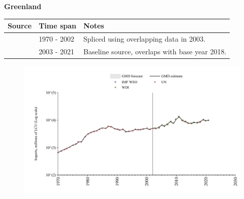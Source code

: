 \documentclass[12pt,a4paper,landscape]{article}
\begin{document}
\begin{adjustbox}{max totalsize={\paperwidth}{\paperheight},center}
\begin{minipage}[t][\textheight][t]{\textwidth}
\vspace*{0.5cm}
{}
\begin{center}
{\Large\bfseries Greenland}
\end{center}
\vspace{0.5cm}
\begin{table}[H]
\centering
\small
\begin{tabular}{|l|l|l|}
\hline
\textbf{Source} & \textbf{Time span} & \textbf{Notes} \\
\hline
\rowcolor{white}\cite{UN}& 1970 - 2002 &Spliced using overlapping data in 2003.\\
\rowcolor{lightgray}\cite{WDI}& 2003 - 2021 &Baseline source, overlaps with base year 2018.\\
\hline
\end{tabular}
\end{table}
\begin{figure}[H]
\centering
\includegraphics[width=\textwidth,height=0.6\textheight,keepaspectratio]{graphs/GRL_imports.pdf}
\end{figure}
\end{minipage}
\end{adjustbox}
\end{document}
